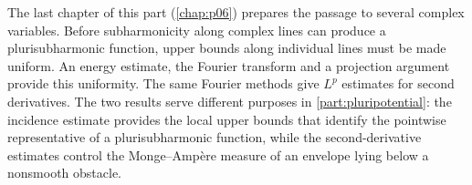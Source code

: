 The last chapter of this part (\cref{chap:p06}) prepares the passage to several complex variables. Before subharmonicity along complex lines can produce a plurisubharmonic function, upper bounds along individual lines must be made uniform. An energy estimate, the Fourier transform and a projection argument provide this uniformity. The same Fourier methods give $L^p$ estimates for second derivatives. The two results serve different purposes in \cref{part:pluripotential}: the incidence estimate provides the local upper bounds that identify the pointwise representative of a plurisubharmonic function, while the second-derivative estimates control the Monge--Amp\`ere measure of an envelope lying below a nonsmooth obstacle.
